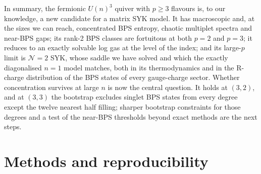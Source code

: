 \documentclass[10pt]{article}
\begin{document}
In summary, the fermionic $U(n)^3$ quiver with $p\ge3$ flavours is, to our knowledge, a new candidate for a matrix
SYK model. It has macroscopic and, at the sizes we can reach, concentrated BPS entropy, chaotic multiplet spectra and
near-BPS gaps; its rank-2 BPS classes are fortuitous at both $p=2$ and $p=3$; it reduces to an exactly solvable log gas
at the level of the index; and its large-$p$ limit is $\mathcal N=2$ SYK, whose saddle we have solved and which the
exactly diagonalised $n=1$ model matches, both in its thermodynamics and in the R-charge distribution of the BPS
states of every gauge-charge sector. Whether concentration survives
at large $n$ is now the central question. It holds at $(3,2)$, and at $(3,3)$ the bootstrap excludes singlet BPS states
from every degree except the twelve nearest half filling; sharper bootstrap constraints for those degrees and a test
of the near-BPS thresholds beyond exact methods are the next steps.

\appendix
\section{Methods and reproducibility}\label{app:methods}
\end{document}
